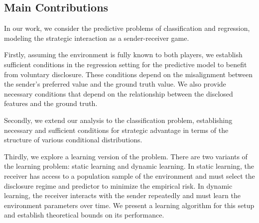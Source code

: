\subsection{Main Contributions}

In our work, we consider the predictive problems of classification and regression, modeling the strategic interaction as a sender-receiver game. 

Firstly, assuming the environment is fully known to both players, we establish sufficient conditions in the regression setting for the predictive model to benefit from voluntary disclosure. These conditions depend on the misalignment between the sender's preferred value and the ground truth value. We also provide necessary conditions that depend on the relationship between the disclosed features and the ground truth. %

Secondly, we extend our analysis to the classification problem, establishing necessary and sufficient conditions for strategic advantage in terms of the structure of various conditional distributions.

Thirdly, we explore a learning version of the problem. There are two variants of the learning problem: static learning and dynamic learning. In static learning, the receiver has access to a population sample of the environment and must select the disclosure regime and predictor to minimize the empirical risk. In dynamic learning, the receiver interacts with the sender repeatedly and must learn the environment parameters over time. We present a learning algorithm for this setup and establish theoretical bounds on its performance.
